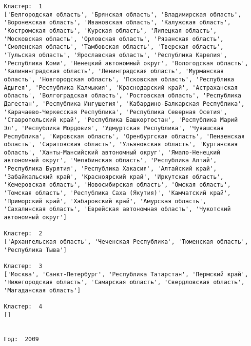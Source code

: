\documentclass[11pt]{article}
\begin{document}
\begin{Verbatim}[commandchars=\\\{\}]
Кластер:  1
['Белгородская область', 'Брянская область', 'Владимирская область', 'Воронежская область', 'Ивановская область', 'Калужская область', 'Костромская область', 'Курская область', 'Липецкая область', 'Московская область', 'Орловская область', 'Рязанская область', 'Смоленская область', 'Тамбовская область', 'Тверская область', 'Тульская область', 'Ярославская область', 'Республика Карелия', 'Республика Коми', 'Ненецкий автономный округ', 'Вологодская область', 'Калинингpадская область', 'Ленинградская область', 'Мурманская область', 'Новгородская область', 'Псковская область', 'Республика Адыгея', 'Республика Калмыкия', 'Краснодарский край', 'Астраханская область', 'Волгоградская область', 'Ростовская область', 'Республика Дагестан', 'Республика Ингушетия', 'Кабардино-Балкарская Республика', 'Карачаево-Черкесская Республика', 'Республика Северная Осетия', 'Ставропольский край', 'Республика Башкортостан', 'Республика Марий Эл', 'Республика Мордовия', 'Удмуртская Республика', 'Чувашская Республика', 'Кировская область', 'Оренбургская область', 'Пензенская область', 'Саратовская область', 'Ульяновская область', 'Курганская область', 'Ханты-Мансийский автономный округ', 'Ямало-Ненецкий автономный округ', 'Челябинская область', 'Республика Алтай', 'Республика Бурятия', 'Республика Хакасия', 'Алтайский край', 'Забайкальский край', 'Красноярский край', 'Иркутская область', 'Кемеровская область', 'Новосибирская область', 'Омская область', 'Томская область', 'Республика Саха (Якутия)', 'Камчатский край', 'Приморский край', 'Хабаровский край', 'Амурская область', 'Сахалинская область', 'Еврейская автономная область', 'Чукотский автономный округ']

Кластер:  2
['Архангельская область', 'Чеченская Республика', 'Тюменская область', 'Республика Тыва']

Кластер:  3
['Москва', 'Санкт-Петербург', 'Республика Татарстан', 'Пермский край', 'Нижегородская область', 'Самарская область', 'Свердловская область', 'Магаданская область']

Кластер:  4
[]


Год:  2009


\end{Verbatim}
\end{document}
